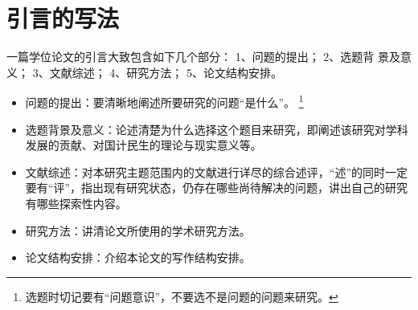 \section{引言的写法}

一篇学位论文的引言大致包含如下几个部分：
1、问题的提出；
2、选题背 景及意义；
3、文献综述；
4、研究方法；
5、论文结构安排。
\begin{itemize}
  \item 问题的提出：要清晰地阐述所要研究的问题“是什么”。
    \footnote{选题时切记要有“问题意识”，不要选不是问题的问题来研究。}
  \item 选题背景及意义：论述清楚为什么选择这个题目来研究，即阐述该研究对学科发展的贡献、对国计民生的理论与现实意义等。
  \item 文献综述：对本研究主题范围内的文献进行详尽的综合述评，“述”的同时一定要有“评”，指出现有研究状态，仍存在哪些尚待解决的问题，讲出自己的研究有哪些探索性内容。
  \item 研究方法：讲清论文所使用的学术研究方法。
  \item 论文结构安排：介绍本论文的写作结构安排。
\end{itemize}

